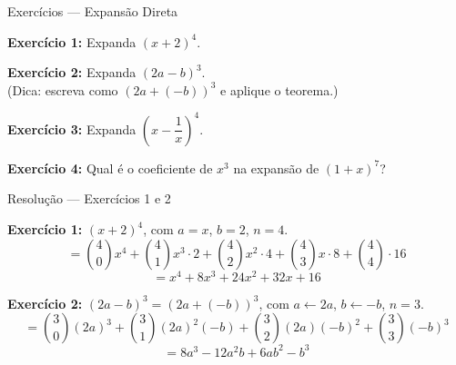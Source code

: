\documentclass[9pt]{beamer}
\begin{document}

\begin{frame}{Exercícios — Expansão Direta}

\textbf{Exercício 1:} Expanda $(x + 2)^4$.

\vspace{0.4cm}

\textbf{Exercício 2:} Expanda $(2a - b)^3$. \\
(Dica: escreva como $(2a + (-b))^3$ e aplique o teorema.)

\vspace{0.4cm}

\textbf{Exercício 3:} Expanda $\left(x - \dfrac{1}{x}\right)^4$.

\vspace{0.4cm}

\textbf{Exercício 4:} Qual é o coeficiente de $x^3$ na expansão de $(1 + x)^7$?
\end{frame}


\begin{frame}{Resolução — Exercícios 1 e 2}

\textbf{Exercício 1:} $(x+2)^4$, com $a=x$, $b=2$, $n=4$.
\[
= \binom{4}{0}x^4 + \binom{4}{1}x^3 \cdot 2 + \binom{4}{2}x^2 \cdot 4 + \binom{4}{3}x \cdot 8 + \binom{4}{4}\cdot 16
\]
\[
= x^4 + 8x^3 + 24x^2 + 32x + 16
\]

\vspace{0.4cm}

\textbf{Exercício 2:} $(2a-b)^3 = (2a+(-b))^3$, com $a \leftarrow 2a$, $b \leftarrow -b$, $n=3$.
\[
= \binom{3}{0}(2a)^3 + \binom{3}{1}(2a)^2(-b) + \binom{3}{2}(2a)(-b)^2 + \binom{3}{3}(-b)^3
\]
\[
= 8a^3 - 12a^2b + 6ab^2 - b^3
\]
\end{frame}

\end{document}
